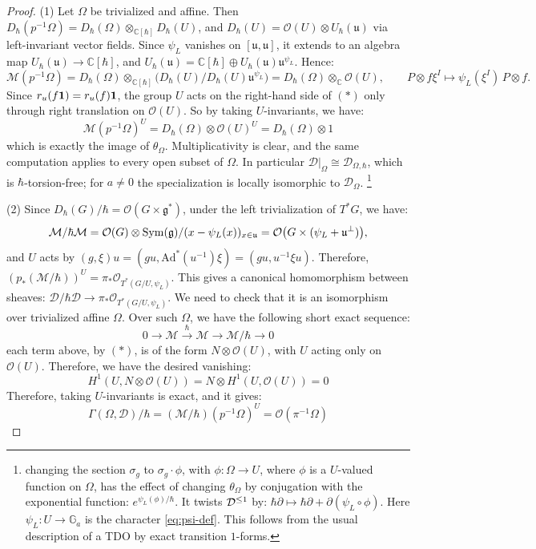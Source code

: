 \documentclass{article}
\theoremstyle{plain}
\theoremstyle{definition}
\theoremstyle{remark}
\numberwithin{equation}{section}
\begin{document}
\begin{proof}
(1) Let $\Omega$ be trivialized and affine. Then $D_\hbar(p^{-1}\Omega)=D_\hbar(\Omega)\otimes_{\mathbb C[\hbar]}D_\hbar(U)$, and
$D_\hbar(U)=\mathcal O(U)\otimes U_\hbar(\mathfrak u)$ via left-invariant vector fields. Since $\psi_L$ vanishes on
$[\mathfrak u,\mathfrak u]$, it extends to an algebra map $U_\hbar(\mathfrak u)\to\mathbb C[\hbar]$, and
$U_\hbar(\mathfrak u)=\mathbb C[\hbar]\oplus U_\hbar(\mathfrak u)\mathfrak u^{\psi_L}$. Hence:
\[
\mathcal M(p^{-1}\Omega)=D_\hbar(\Omega)\otimes_{\mathbb C[\hbar]}\bigl(D_\hbar(U)/D_\hbar(U)\mathfrak u^{\psi_L}\bigr)
=D_\hbar(\Omega)\otimes_{\mathbb C}\mathcal O(U),\qquad P\otimes f\xi^I\mapsto \psi_L(\xi^I)\,P\otimes f .
\tag{$\ast$}
\]
Since $r_u(f\mathbf 1)=r_u(f)\mathbf 1$, the group $U$ acts on the right-hand side of $(\ast)$ only through right
translation on $\mathcal O(U)$. So by taking $U$-invariants, we have:
\[
\mathcal M(p^{-1}\Omega)^U=D_\hbar(\Omega)\otimes\mathcal O(U)^U=D_\hbar(\Omega)\otimes1
\]
which is exactly 
the image of $\theta_\Omega$. Multiplicativity is clear, and the same computation applies to every open subset of $\Omega$.
In particular $\mathcal D|_\Omega\cong\mathcal D_{\Omega,\hbar}$, which is $\hbar$-torsion-free; for $a\ne0$ the specialization is
locally isomorphic to $\mathcal D_\Omega$. \footnote{changing the section $\sigma_g$ to $\sigma_g\cdot\phi$, with $\phi\colon \Omega\to U$, where $\phi$ is a $U$-valued function on $\Omega$, has the effect of changing $\theta_\Omega$ by conjugation with the exponential function: $e^{\psi_L(\phi)/\hbar}$. It twists $\mathcal D^{\leq 1}$  by: $\hbar\partial\mapsto\hbar\partial+\partial(\psi_L\circ\phi)$.
Here $\psi_L\colon U\to\mathbb G_a$ is the character \eqref{eq:psi-def}. This follows from the usual description of a TDO by exact transition
$1$-forms.}

(2) Since $D_\hbar(G)/\hbar=\mathcal O(G\times\mathfrak g^*)$, under the left trivialization of $T^*G$, we have:
\[
\mathcal M/\hbar\mathcal M=\mathcal O(G)\otimes \operatorname{Sym}(\mathfrak g)/(x-\psi_L(x))_{x\in\mathfrak u}=\mathcal O\bigl(G\times(\psi_L+\mathfrak u^\perp)\bigr),
\]
and $U$ acts by $(g,\xi)u=(gu,\mathrm{Ad}^*(u^{-1})\xi) = (gu, u^{-1}\xi u)$. Therefore,
$(p_*(\mathcal M/\hbar))^U=\pi_*\mathcal O_{T^*(G/U,\psi_L)}$. This gives a canonical homomorphism between sheaves:
$\mathcal D/\hbar\mathcal D\to\pi_*\mathcal O_{T^*(G/U,\psi_L)}$. We need to check that it is an isomorphism over trivialized affine $\Omega$. Over such $\Omega$, we have the following short exact sequence:
\[
0\to\mathcal M\xrightarrow{\hbar}\mathcal M\to\mathcal M/\hbar\to0
\]
each term above, by $(\ast)$, is of
the form $N\otimes\mathcal O(U)$, with $U$ acting only on $\mathcal O(U)$. Therefore, we have the desired vanishing:
\[
H^1(U,N\otimes\mathcal O(U))=N\otimes H^1(U,\mathcal O(U))=0
\]
Therefore, taking $U$-invariants is exact, and it gives:
\[
\Gamma(\Omega,\mathcal D)/\hbar=(\mathcal M/\hbar)(p^{-1}\Omega)^U=\mathcal O(\pi^{-1}\Omega)
\]


\end{proof}
\end{document}
